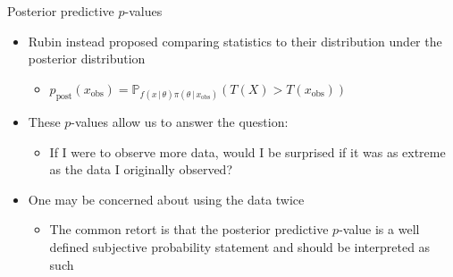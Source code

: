\begin{frame}{Posterior predictive $p$-values}
  \begin{itemize}
    \item Rubin \cite{Rubin1984-tw} instead proposed comparing statistics to their distribution under the posterior distribution
    \begin{itemize}
      \item $p_{\textrm{post}}(x_{\textrm{obs}}) = \mathbb{P}_{f(x\,|\,\theta)\pi(\theta\,|\,x_{\textrm{obs}})}(T(X) > T(x_{\textrm{obs}}))$
    \end{itemize}
    \vspace{\baselineskip}
    \pause
    \item These $p$-values allow us to answer the question:
    \begin{itemize}
      \item If I were to observe more data, would I be surprised if it was as extreme as the data I originally observed?
    \end{itemize}
    \vspace{\baselineskip}
    \pause
    \item One may be concerned about using the data twice
    \begin{itemize}
      \item The common retort is that the posterior predictive $p$-value is a well defined subjective probability statement and should be interpreted as such
    \end{itemize}
  \end{itemize}
\end{frame}

